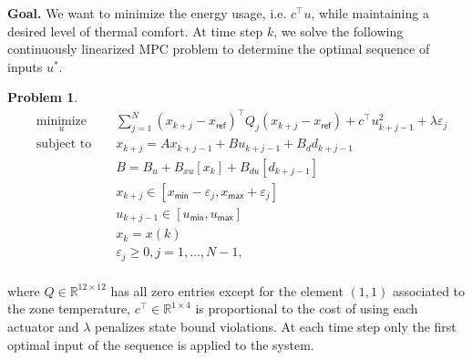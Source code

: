 \documentclass[]{ifacconf}  %
\newtheorem{problem}{Problem}
\begin{document}
\textbf{Goal.} We want to minimize the energy usage, i.e. $c^\top u$, while maintaining a desired level of thermal comfort. At time step $k$, we solve the following continuously linearized MPC problem to determine the optimal sequence of inputs $u^*$.
\begin{problem}\label{pbMPC}
\small
\begin{equation}
\begin{aligned}
& \underset{u}{\text{minimize}} & &  \sum_{j=1}^N \left( x_{k+j} - x_{\mathsf{ref}}\right)^\top Q_j \left( x_{k+j} - x_{\mathsf{ref}}\right)
                                                           + c^\top u_{k+j-1}^2 + \lambda\varepsilon_j                                          \\
& \text{subject to }            & &  x_{k+j}         =   A x_{k+j-1}+B u_{k+j-1}+B_d d_{k+j-1} \label{eqBilinearOptimization}                   \\
&                               & &  B               =   B_u + B_{xu}[x_k] + B_{du}[d_{k+j-1}]                                                  \\
&                               & &  x_{k+j}        \in  [x_{\mathsf{min}} - \varepsilon_j,x_\mathsf{max} + \varepsilon_j]                      \\
&                               & &  u_{k+j-1}      \in  [u_{\mathsf{min}},u_\mathsf{max}] 													    \\
&                               & &  x_k             =   x(k)                                                                                   \\
&                               & &  \varepsilon_j  \geq 0, j = 1,\dots,N-1,                                                                    \\
\end{aligned}
\end{equation}
\normalsize
\end{problem}
where $Q\in\mathbb{R}^{12\times12}$ has all zero entries except for the element $(1,1)$ associated to the zone temperature, $c^\top\in\mathbb{R}^{1\times4}$ is proportional to the cost of using each actuator and $\lambda$ penalizes state bound violations. At each time step only the first optimal input of the sequence is applied to the system.
\end{document}
